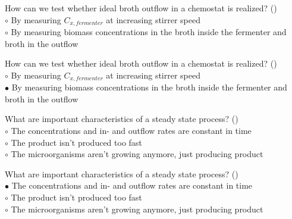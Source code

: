 \documentclass[]{beamer}
\begin{document}
\begin{frame}[shrink] {}
\addtocounter{questions}{1}
\color{blue}
How can we test whether ideal broth outflow in a chemostat is realized? ()\\
\color{black}
\setlength{\parindent}{-0.4cm}
{\color{red}$\circ$}  By measuring $C_{x,fermenter}$ at increasing stirrer speed\\
{\color{red}$\circ$} By measuring biomass concentrations in the broth inside the fermenter and broth in the outflow \\
\end{frame}
\begin{frame}[shrink] {}
\addtocounter{answers}{1}
\color{blue}
How can we test whether ideal broth outflow in a chemostat is realized? ()\\
\color{black}
\setlength{\parindent}{-0.4cm}
{\color{red}$\circ$}  By measuring $C_{x,fermenter}$ at increasing stirrer speed\\
{\color{red}$\bullet$} By measuring biomass concentrations in the broth inside the fermenter and broth in the outflow \\
\end{frame}

\begin{frame}[shrink] {}
\addtocounter{questions}{1}
\color{blue}
What are important characteristics of a steady state process? ()\\
\color{black}
\setlength{\parindent}{-0.4cm}
{\color{red}$\circ$}   The concentrations and in- and outflow rates are constant in time \\
{\color{red}$\circ$} The product isn’t produced too fast\\
{\color{red}$\circ$} The microorganisms aren’t growing anymore, just producing product \\
\end{frame}
\begin{frame}[shrink] {}
\addtocounter{answers}{1}
\color{blue}
What are important characteristics of a steady state process? ()\\
\color{black}
\setlength{\parindent}{-0.4cm}
{\color{red}$\bullet$}   The concentrations and in- and outflow rates are constant in time \\
{\color{red}$\circ$} The product isn’t produced too fast\\
{\color{red}$\circ$} The microorganisms aren’t growing anymore, just producing product \\
\end{frame}
\end{document}
